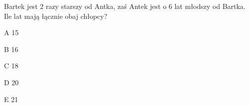 \begin{tresc}
Bartek jest 2 razy starszy od Antka, zaś Antek jest o 6 lat młodszy od Bartka. Ile lat mają łącznie obaj chłopcy?
\end{tresc}
\begin{wariant}{A} 15 \end{wariant}
\begin{wariant}{B} 16 \end{wariant}
\begin{wariant}{C} 18 \end{wariant}
\begin{wariant}{D} 20 \end{wariant}
\begin{wariant}{E} 21 \end{wariant}
